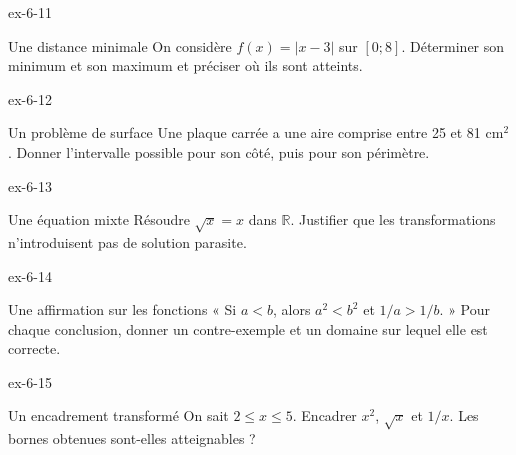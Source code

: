 \clearpage{}
\begin{blocLivre}{ex-6-11}
\begin{exercice}[3]{Une distance minimale}
On considère $f(x)=|x-3|$ sur $[0;8]$. Déterminer son minimum et son maximum et préciser où ils sont atteints.
\end{exercice}
\end{blocLivre}
\begin{blocLivre}{ex-6-12}
\begin{exercice}[3]{Un problème de surface}
Une plaque carrée a une aire comprise entre 25 et 81 cm$^2$. Donner l’intervalle possible pour son côté, puis pour son périmètre.
\end{exercice}
\end{blocLivre}
\begin{blocLivre}{ex-6-13}
\begin{exercice}[3]{Une équation mixte}
Résoudre $\sqrt x=x$ dans $\mathbb R$. Justifier que les transformations n’introduisent pas de solution parasite.
\end{exercice}
\end{blocLivre}
\begin{blocLivre}{ex-6-14}
\begin{exercice}[3]{Une affirmation sur les fonctions}
« Si $a<b$, alors $a^2<b^2$ et $1/a>1/b$. » Pour chaque conclusion, donner un contre-exemple et un domaine sur lequel elle est correcte.
\end{exercice}
\end{blocLivre}
\begin{blocLivre}{ex-6-15}
\begin{exercice}[3]{Un encadrement transformé}
On sait $2\le x\le5$. Encadrer $x^2$, $\sqrt x$ et $1/x$. Les bornes obtenues sont-elles atteignables ?
\end{exercice}
\end{blocLivre}

\clearpage
